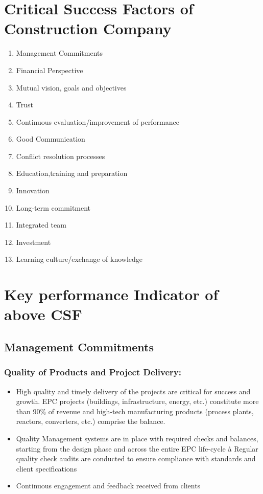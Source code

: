 \section{Critical Success Factors of Construction Company}

\begin{enumerate}
    \item Management Commitments
    \item Financial Perspective
    \item Mutual vision, goals and objectives
    \item Trust
    \item Continuous evaluation/improvement of performance
    \item Good Communication 
    \item Conflict resolution processes 
    \item Education,training and preparation 
    \item Innovation
    \item Long-term commitment 
    \item Integrated team 
    \item Investment
    \item Learning culture/exchange of knowledge
\end{enumerate}
\newpage
\section{Key performance Indicator of above CSF}

\subsection{Management Commitments}
 \subsubsection{ \textbf{Quality of Products and Project Delivery:}}
    \begin{itemize}
        \item  
         High quality and timely delivery of the projects are critical for success and growth. EPC projects (buildings, infrastructure, energy, etc.) constitute more than 90\% of revenue and high-tech manufacturing products (process plants, reactors, converters, etc.) comprise the balance. 
        \item Quality Management systems are in place with required checks and balances, starting from the design phase and across the entire EPC life-cycle à Regular quality check audits are conducted to ensure compliance with standards and client specifications 
        \item Continuous engagement and feedback received
        from clients
    \end{itemize}
